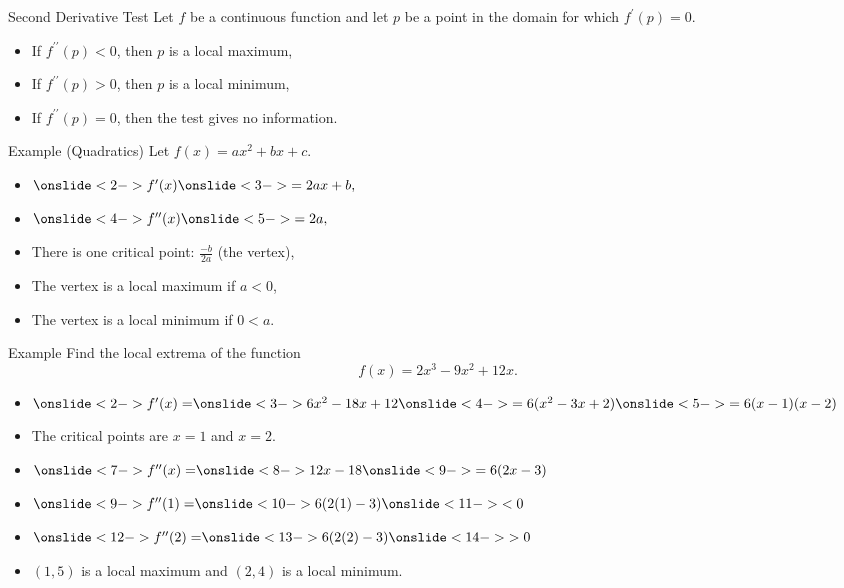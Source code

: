 \documentclass[Lecture.tex]{subfiles}
\begin{document}
\begin{frame}{Second Derivative Test}
  Let $f$ be a continuous function and let $p$ be a point in the domain for which $f^\prime(p) = 0$.
  \begin{itemize}
  \item<2->
    If $f^{\prime\prime}(p) < 0$, then $p$ is a local maximum,
  \item<3->
    If $f^{\prime\prime}(p) > 0$, then $p$ is a local minimum,
  \item<4->
    If $f^{\prime\prime}(p) = 0$, then the test gives no information.
  \end{itemize}
\end{frame}

\begin{frame}{Example (Quadratics)}
  Let $f(x) = ax^2 + bx + c$.
  \begin{itemize}
    \item<2->
      $\onslide<2->{f^\prime(x)} \onslide<3->{= 2ax + b,}$
    \item<4->
      $\onslide<4->{f^{\prime\prime}(x)} \onslide<5->{= 2a,}$
    \item<6->
      There is one critical point: $\displaystyle{\frac{-b}{2a}}$ (the vertex),
    \item<7->
      The vertex is a local maximum if $a < 0$,
    \item<8->
      The vertex is a local minimum if $0 < a$.
  \end{itemize}
\end{frame}

\begin{frame}{Example}
  Find the local extrema of the function 
  $$f(x) = 2x^3 - 9x^2 + 12x.$$

  \begin{itemize}
    \item<2->
      $\onslide<2->{f^\prime(x) =}\onslide<3->{ 6x^2 - 18x + 12}\onslide<4->{= 6(x^2 - 3x + 2)}\onslide<5->{= 6(x - 1)(x - 2)}$
    \item<6->
      The critical points are $x = 1$ and $x = 2$.
    \item<7->
      $\onslide<7->{f^{\prime\prime}(x) = } \onslide<8->{12x - 18} \onslide<9->{= 6(2x - 3)}$
    \item<9->
      $\onslide<9->{f^{\prime\prime}(1) =} 
      \onslide<10->{6(2(1) - 3)} 
      \onslide<11->{< 0}$
    \item<12->
      $\onslide<12->{f^{\prime\prime}(2) =}
      \onslide<13->{6(2(2) - 3)}
      \onslide<14->{ > 0}$
    \item<15->
      $(1,5)$ is a local maximum and $(2,4)$ is a local minimum.
  \end{itemize}
  
\end{frame}
\end{document}

